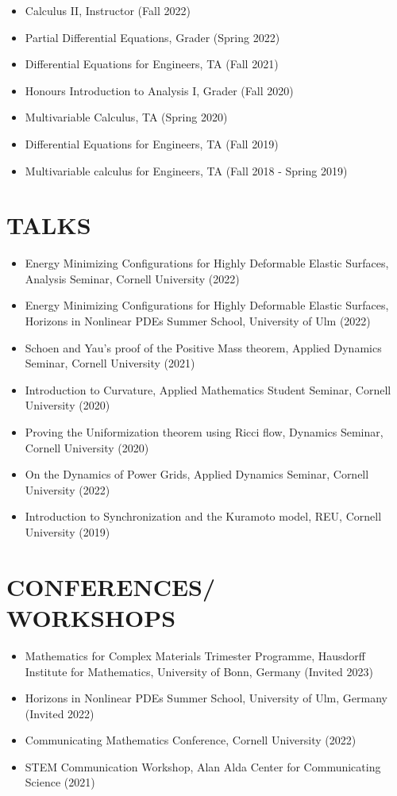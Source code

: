 \documentclass[margin]{res} %
\begin{document}
\begin{resume}
\begin{itemize}
	\item Calculus II, Instructor (Fall 2022)
	\item Partial Differential Equations, Grader (Spring 2022)
	\item Differential Equations for Engineers, TA (Fall 2021)
	\item Honours Introduction to Analysis I, Grader (Fall 2020)
	\item Multivariable Calculus, TA (Spring 2020)
	\item Differential Equations for Engineers, TA (Fall 2019)
	\item Multivariable calculus for Engineers, TA (Fall 2018 - Spring 2019)
\end{itemize}

\section{TALKS}
\begin{itemize}
	\item Energy Minimizing Configurations for Highly Deformable Elastic Surfaces, Analysis Seminar, Cornell University (2022)
	\item Energy Minimizing Configurations for Highly Deformable Elastic Surfaces, Horizons in Nonlinear PDEs Summer School, University of Ulm (2022)
	\item Schoen and Yau's proof of the Positive Mass theorem, Applied Dynamics Seminar, Cornell University (2021)
	\item Introduction to Curvature, Applied Mathematics Student Seminar, Cornell University (2020)
	\item Proving the Uniformization theorem using Ricci flow, Dynamics Seminar, Cornell University (2020)
	\item On the Dynamics of Power Grids, Applied Dynamics Seminar, Cornell University (2022)
	\item Introduction to Synchronization and the Kuramoto model, REU, Cornell University (2019)
\end{itemize}

\section{CONFERENCES/\\WORKSHOPS}
\begin{itemize}
	\item Mathematics for Complex Materials Trimester Programme, Hausdorff Institute for Mathematics, University of Bonn, Germany (Invited 2023)
	\item Horizons in Nonlinear PDEs Summer School, University of Ulm, Germany (Invited 2022)
	\item Communicating Mathematics Conference, Cornell University (2022)
	\item STEM Communication Workshop, Alan Alda Center for Communicating Science (2021)
\end{itemize}


\end{resume}
\end{document}
